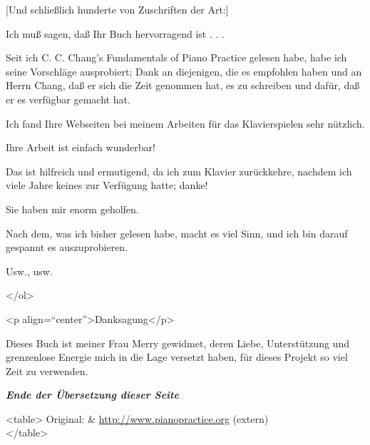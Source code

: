 \item \label{testimonials25}
[Und schließlich hunderte von Zuschriften der Art:]

Ich muß sagen, daß Ihr Buch hervorragend ist . . .

Seit ich C. C. Chang's Fundamentals of Piano Practice gelesen habe, habe ich seine Vorschläge ausprobiert; Dank an diejenigen, die es empfohlen haben und an Herrn Chang, daß er sich die Zeit genommen hat, es zu schreiben und dafür, daß er es verfügbar gemacht hat.

Ich fand Ihre Webseiten bei meinem Arbeiten für das Klavierspielen sehr nützlich.

Ihre Arbeit ist einfach wunderbar!

Das ist hilfreich und ermutigend, da ich zum Klavier zurückkehre, nachdem ich viele Jahre keines zur Verfügung hatte; danke!

Sie haben mir enorm geholfen.

Nach dem, was ich bisher gelesen habe, macht es viel Sinn, und ich bin darauf gespannt es auszuprobieren.

Usw., usw.


</ol> 



<p align=\enquote{center}>Danksagung</p>

Dieses Buch ist meiner Frau Merry gewidmet, deren Liebe, Unterstützung und grenzenlose Energie mich in die Lage versetzt haben, für dieses Projekt so viel Zeit zu verwenden.
 

\textbf{\textit{Ende der Übersetzung dieser Seite}}

<table>
 Original: & \hyperref[http://www.pianopractice.org]{http://www.pianopractice.org} (extern) \\ 
</table>





